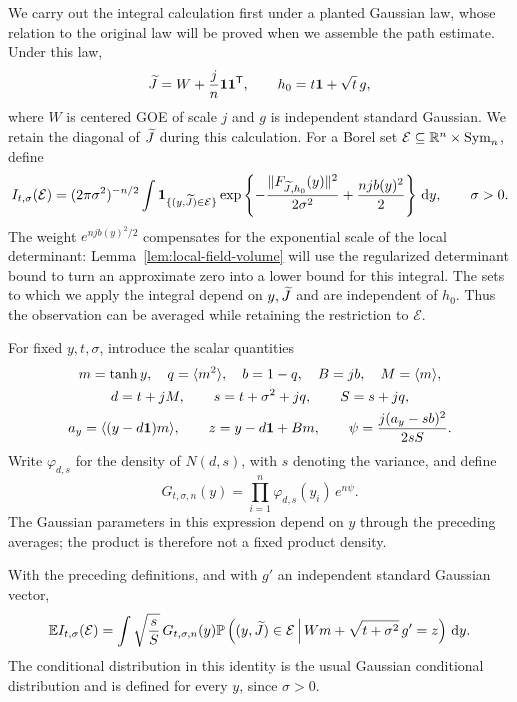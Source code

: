 We carry out the integral calculation first under a planted Gaussian
law, whose relation to the original law will be proved when we assemble
the path estimate. Under this law,
\begin{equation}
 \widetilde J=W+\frac jn\mathbf 1\mathbf 1^{\mathsf T},\qquad
 h_0=t\mathbf 1+\sqrt t\,g,
 \label{eq:planted-field}
\end{equation}
where $W$ is centered GOE of scale $j$ and $g$ is independent standard
Gaussian. We retain the diagonal of $\widetilde J$ during this calculation.
For a Borel set $\mathcal E\subseteq\mathbb R^n\times\mathrm{Sym}_n$, define
\begin{equation}
 I_{t,\sigma}(\mathcal E)
 =(2\pi\sigma^2)^{-n/2}\int
 \mathbf 1_{\{(y,\widetilde J)\in\mathcal E\}}
 \exp\left\{-\frac{\lVert F_{\widetilde J,h_0}(y)\rVert^2}{2\sigma^2}
              +\frac{njb(y)^2}{2}\right\}\,\mathrm d y,
 \qquad \sigma>0.
 \label{eq:field-integral}
\end{equation}
The weight $e^{njb(y)^2/2}$ compensates for the exponential scale of
the local determinant: Lemma~\ref{lem:local-field-volume} will use the
regularized determinant bound to turn an approximate zero into a lower
bound for this integral. The sets to which we apply the integral depend
on $y,\widetilde J$ and are independent of $h_0$. Thus the observation can be
averaged while retaining the restriction to $\mathcal E$.

For fixed $y,t,\sigma$, introduce the scalar quantities
\begin{equation}
 \begin{gathered}
 m=\tanh y,\quad q=\langle m^2\rangle,\quad b=1-q,\quad B=jb,
 \quad M=\langle m\rangle,\\
 d=t+jM,\qquad s=t+\sigma^2+jq,\qquad S=s+jq,\\
 a_y=\langle (y-d\mathbf 1)m\rangle,\qquad z=y-d\mathbf 1+Bm,\qquad
 \psi=\frac{j(a_y-sb)^2}{2sS}.
 \label{eq:scalar-parameters}
 \end{gathered}
\end{equation}
Write $\varphi_{d,s}$ for the density of $N(d,s)$, with $s$ denoting
the variance, and define
\begin{equation}
 G_{t,\sigma,n}(y)
 =\prod_{i=1}^n\varphi_{d,s}(y_i)\,e^{n\psi}.
 \label{eq:scalar-density}
\end{equation}
The Gaussian parameters in this expression depend on $y$ through the
preceding averages; the product is therefore not a fixed product density.

\begin{lemma}
\label{lem:gaussian-reduction}
With the preceding definitions, and with $g'$ an independent standard
Gaussian vector,
\begin{equation}
 \mathbb E I_{t,\sigma}(\mathcal E)
 =\int \sqrt{\frac sS}\,G_{t,\sigma,n}(y)
 \mathbb P\left((y,\widetilde J)\in\mathcal E\,\middle|\,
       Wm+\sqrt{t+\sigma^2}\,g'=z\right)\,\mathrm d y.
 \label{eq:conditional-integral}
\end{equation}
The conditional distribution in this identity is the usual Gaussian
conditional distribution and is defined for every $y$, since
$\sigma>0$.
\end{lemma}

